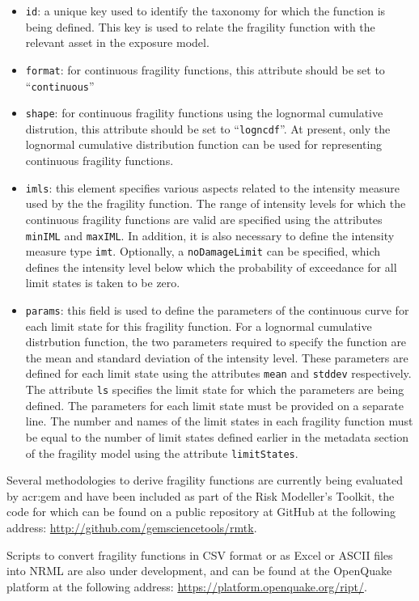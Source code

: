\begin{itemize}

    \item \Verb+id+: a unique key used to identify the \gls{taxonomy} for 
    which the function is being defined. This key is used to relate the 
    \gls{fragility function} with the relevant \gls{asset} in the 
    \gls{exposure model}.

    \item \Verb+format+: for continuous fragility functions, this attribute 
    should be set to ``\Verb+continuous+''

    \item \Verb+shape+: for continuous fragility functions using the lognormal
    cumulative distrution, this attribute should be set to ``\Verb+logncdf+''.
    At present, only the lognormal cumulative distribution function can be 
    used for representing continuous fragility functions.

    \item \Verb+imls+: this element specifies various aspects related to the 
    intensity measure used by the the \gls{fragility function}. The range of 
    intensity levels for which the continuous fragility functions are valid 
    are specified using the attributes \Verb+minIML+ and \Verb+maxIML+. 
    In addition, it is also necessary to define the intensity measure type 
    \Verb+imt+. Optionally, a \Verb+noDamageLimit+ can be specified, which 
    defines the intensity level below which the probability of exceedance 
    for all limit states is taken to be zero.

    \item \Verb+params+: this field is used to define the parameters of the 
    continuous curve for each limit state for this 
    \gls{fragility function}. For a lognormal cumulative distrbution function, 
    the two parameters required to specify the function are the mean and 
    standard deviation of the intensity level. These parameters are defined for 
    each limit state using the attributes \Verb+mean+ and \Verb+stddev+ 
    respectively. The attribute \Verb+ls+ specifies the limit state for which 
    the parameters are being defined. The parameters for each limit state
    must be provided on a separate line. The number and names of the limit 
    states in each fragility function must be equal to the number of limit 
    states defined earlier in the metadata section of the \gls{fragility model}
    using the attribute \Verb+limitStates+.

\end{itemize}


Several methodologies to derive fragility functions are currently being
evaluated by \gls{acr:gem} and have been included as part of the Risk
Modeller's Toolkit, the code for which can be found on a public repository at
GitHub at the following address: 
\href{http://github.com/gemsciencetools/rmtk}{http://github.com/gemsciencetools/rmtk}.

Scripts to convert \glspl{fragility function} in CSV format or as Excel or
ASCII files into NRML are also under development, and can be found at the
OpenQuake platform at the following address:
\href{https://platform.openquake.org/ript/}{https://platform.openquake.org/ript/}.
